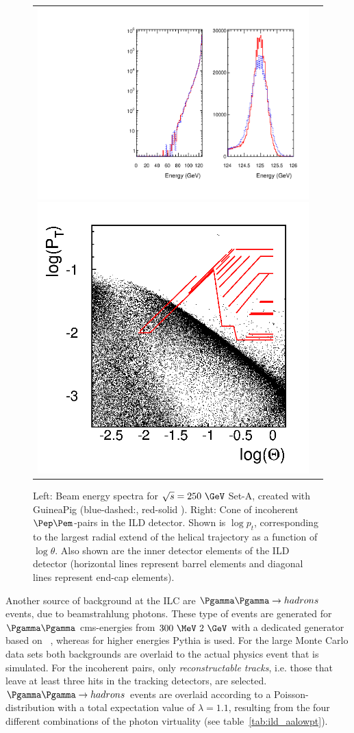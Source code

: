 \begin{figure}[b!]
\begin{tabular}{cc}
  \includegraphics[width=0.51\hsize]{Modelling/fig/beam_spectrum_gp_250Gev_SetA.pdf}
  \includegraphics[width=0.49\hsize]{Modelling/fig/gprun_250_SetA_run1_pairs_small.png}
\end{tabular}
\caption{\label{fig:lumi_spectrum}Left: Beam energy spectra for $\sqrt{s}=250~\GeV$ Set-A, created with GuineaPig (blue-dashed:\Pem, red-solid \Pep).
  Right: Cone of incoherent $\Pep\Pem$-pairs in the ILD detector. Shown is $\log{p_t}$, corresponding to the largest radial extend of the
  helical trajectory as a function of $\log{\theta}$. Also shown are the inner detector elements of the ILD detector (horizontal lines represent
  barrel elements and diagonal lines represent end-cap elements).}
\end{figure}
Another source of background at the ILC are $\Pgamma \Pgamma \to hadrons$ events, due to beamstrahlung photons.
These type of events are generated for $\Pgamma \Pgamma$ cms-energies from $300~\MeV ~2~\GeV$ with a dedicated generator based
on ~\cite{Chen:1993dba}, whereas for higher energies Pythia is used.
%
%
For the large Monte Carlo data sets both backgrounds are overlaid to the actual physics event that is simulated. For the incoherent pairs, only
\emph{reconstructable tracks}, i.e. those that leave at least three hits in the tracking detectors, are selected. $\Pgamma \Pgamma \to hadrons$
events are overlaid according to a Poisson-distribution with a total expectation value of $\lambda= 1.1$, resulting from the four
different combinations of the photon virtuality (see table~\ref{tab:ild_aalowpt}).

